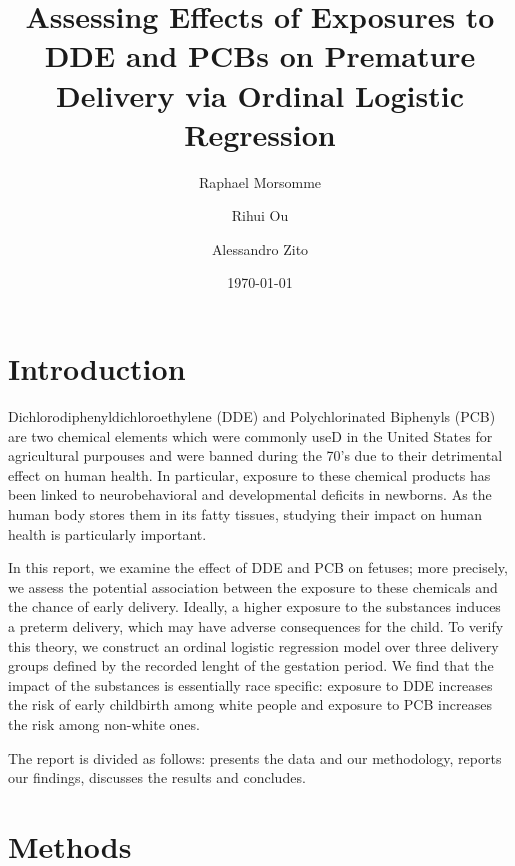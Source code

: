 \documentclass[10pt]{jmlr}%
\title[DDE and PCB effect on Premature delivery]{Assessing Effects of Exposures to DDE and PCBs on Premature Delivery via Ordinal Logistic Regression}	%
\author[Morsomme, Ou, Zito]{Raphael Morsomme \and Rihui Ou \and Alessandro Zito}
\date{\today} %
\begin{document}
\maketitle

\begin{abstract}

\cite{Li_Long_Duns}
\end{abstract}
\newpage
\section{Introduction}
\label{sec:intro}

Dichlorodiphenyldichloroethylene (DDE) and Polychlorinated Biphenyls (PCB) are two chemical elements which were commonly useD in the United States for agricultural purpouses and were banned during the 70's due to their detrimental effect on human health. In particular, exposure to these chemical products has been linked to neurobehavioral and developmental deficits in newborns. As the human body stores them in its fatty tissues, studying their impact on human health is particularly important.

In this report, we examine the effect of DDE and PCB on fetuses; more precisely, we assess the potential association between the exposure to these chemicals and the chance of early delivery. Ideally, a higher exposure to the substances induces a preterm delivery, which may have adverse consequences for the child. To verify this theory, we construct an ordinal logistic regression model over three delivery groups defined by the recorded lenght of the gestation period.  We find that the impact of the substances is essentially race specific: exposure to DDE increases the risk of early childbirth among white people and exposure to PCB increases the risk among non-white ones. 

The report is divided as follows:  presents the data and our methodology,   reports our findings,  discusses the results and concludes.


\section{Methods}
\label{sec:method}
\end{document}
